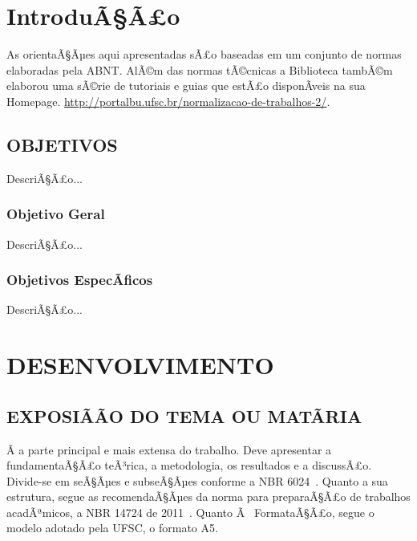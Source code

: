 \documentclass{ufscThesis} %
\begin{document}
\folhaderosto[comficha] %
\folhaaprovacao
\paginadedicatoria
\paginaagradecimento
\paginaepigrafe
\paginaresumo
\paginaabstract
\listadefiguras %
\listadetabelas 
\listadeabreviaturas
\listadesimbolos
\sumario

\chapter{IntroduÃ§Ã£o}
As orientaÃ§Ãµes aqui apresentadas sÃ£o baseadas em um conjunto de normas elaboradas pela ABNT. AlÃ©m das normas tÃ©cnicas a Biblioteca tambÃ©m elaborou  uma sÃ©rie de tutoriais e guias que estÃ£o disponÃ­veis na sua Homepage. \url{http://portalbu.ufsc.br/normalizacao-de-trabalhos-2/}. 


\section{OBJETIVOS}

DescriÃ§Ã£o...

\subsection{Objetivo Geral}

DescriÃ§Ã£o...

\subsection{Objetivos EspecÃ­ficos}

DescriÃ§Ã£o...

\chapter{DESENVOLVIMENTO}

\section{EXPOSIÃÃO DO TEMA OU MATÃRIA}

Ã a parte principal e mais extensa do trabalho. Deve apresentar a fundamentaÃ§Ã£o teÃ³rica, a metodologia, os resultados e a discussÃ£o. Divide-se em seÃ§Ãµes e subseÃ§Ãµes conforme a NBR 6024~\cite{abnt14724}. Quanto a sua estrutura, segue as recomendaÃ§Ãµes da norma para preparaÃ§Ã£o de trabalhos acadÃªmicos, a NBR 14724 de 2011~\cite{abnt14724}. Quanto Ã  FormataÃ§Ã£o, segue o modelo adotado pela UFSC, o formato A5.
\end{document}
